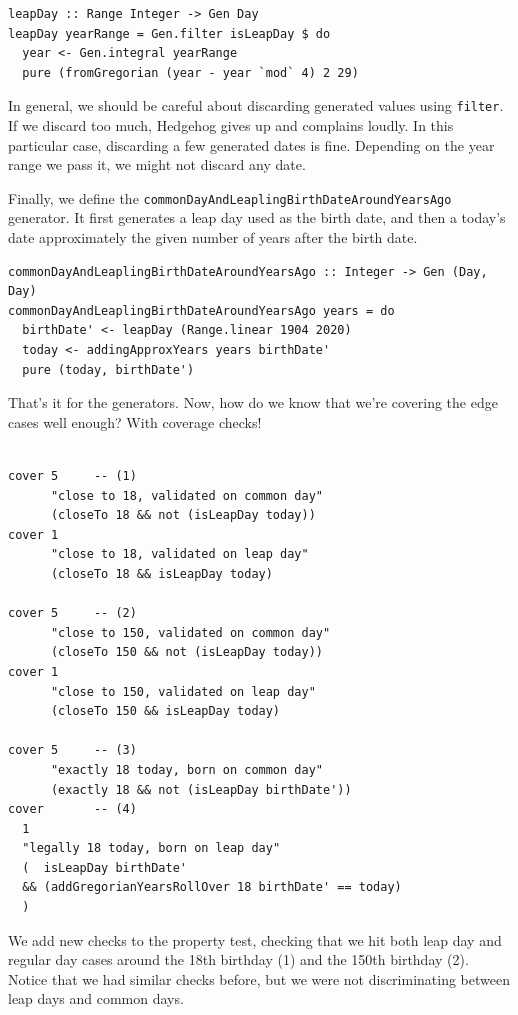 \begin{verbatim}
leapDay :: Range Integer -> Gen Day
leapDay yearRange = Gen.filter isLeapDay $ do
  year <- Gen.integral yearRange
  pure (fromGregorian (year - year `mod` 4) 2 29)
\end{verbatim}
In general, we should be careful about discarding generated values using
\texttt{filter}. If we discard too much, Hedgehog gives up and complains
loudly. In this particular case, discarding a few generated dates is
fine. Depending on the year range we pass it, we might not discard any
date.

Finally, we define the
\texttt{commonDayAndLeaplingBirthDateAroundYearsAgo} generator. It first
generates a leap day used as the birth date, and then a today's date
approximately the given number of years after the birth date.

\begin{verbatim}
commonDayAndLeaplingBirthDateAroundYearsAgo :: Integer -> Gen (Day, Day)
commonDayAndLeaplingBirthDateAroundYearsAgo years = do
  birthDate' <- leapDay (Range.linear 1904 2020)
  today <- addingApproxYears years birthDate'
  pure (today, birthDate')
\end{verbatim}
That's it for the generators. Now, how do we know that we're covering
the edge cases well enough? With coverage checks!

\begin{verbatim}

cover 5     -- (1)
      "close to 18, validated on common day"
      (closeTo 18 && not (isLeapDay today))
cover 1
      "close to 18, validated on leap day"
      (closeTo 18 && isLeapDay today)

cover 5     -- (2)
      "close to 150, validated on common day"
      (closeTo 150 && not (isLeapDay today))
cover 1
      "close to 150, validated on leap day"
      (closeTo 150 && isLeapDay today)

cover 5     -- (3)
      "exactly 18 today, born on common day"
      (exactly 18 && not (isLeapDay birthDate'))
cover       -- (4) 
  1
  "legally 18 today, born on leap day"
  (  isLeapDay birthDate'
  && (addGregorianYearsRollOver 18 birthDate' == today)
  )
\end{verbatim}
We add new checks to the property test, checking that we hit both leap
day and regular day cases around the 18th birthday (1) and the 150th
birthday (2). Notice that we had similar checks before, but we were not
discriminating between leap days and common days.

